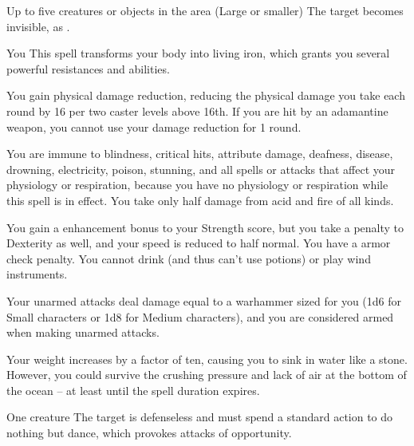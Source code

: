 \spelldur{\durshort \dismissable}
\begin{spelltargets}{Up to five creatures or objects in the area (Large or smaller)}
    \spelleffect The target becomes invisible, as .
\end{spelltargets}

\spelldur{\durshort \dismissable}
\begin{spelltarget}{You}
    \spelleffect This spell transforms your body into living iron, which grants you several powerful resistances and abilities.
    \par You gain physical damage reduction, reducing the physical damage you take each round by 16  per two caster levels above 16th. If you are hit by an adamantine weapon, you cannot use your damage reduction for 1 round.
    \par You are immune to blindness, critical hits, attribute damage, deafness, disease, drowning, electricity, poison, stunning, and all spells or attacks that affect your physiology or respiration, because you have no physiology or respiration while this spell is in effect. You take only half damage from acid and fire of all kinds.
    \par You gain a  enhancement bonus to your Strength score, but you take a  penalty to Dexterity as well, and your speed is reduced to half normal. You have a  armor check penalty. You cannot drink (and thus can't use potions) or play wind instruments.
    \par Your unarmed attacks deal damage equal to a warhammer sized for you (1d6 for Small characters or 1d8 for Medium characters), and you are considered armed when making unarmed attacks.
    \par Your weight increases by a factor of ten, causing you to sink in water like a stone. However, you could survive the crushing pressure and lack of air at the bottom of the ocean -- at least until the spell duration expires.
\end{spelltarget}

\spellrng{\rngclose}
\begin{spelltarget}{One creature}
    \spelleffect The target is defenseless and must spend a standard action to do nothing but dance, which provokes attacks of opportunity.
\end{spelltarget}

